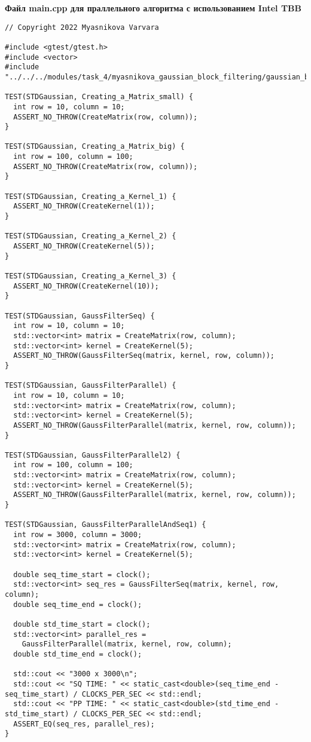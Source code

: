 \documentclass{report}
\begin{document}
\newpage
\textbf{ Файл main.cpp для праллельного алгоритма с использованием Intel TBB }
\begin{lstlisting}
// Copyright 2022 Myasnikova Varvara

#include <gtest/gtest.h>
#include <vector>
#include "../../../modules/task_4/myasnikova_gaussian_block_filtering/gaussian_block_filtering.h"

TEST(STDGaussian, Creating_a_Matrix_small) {
  int row = 10, column = 10;
  ASSERT_NO_THROW(CreateMatrix(row, column));
}

TEST(STDGaussian, Creating_a_Matrix_big) {
  int row = 100, column = 100;
  ASSERT_NO_THROW(CreateMatrix(row, column));
}

TEST(STDGaussian, Creating_a_Kernel_1) {
  ASSERT_NO_THROW(CreateKernel(1));
}

TEST(STDGaussian, Creating_a_Kernel_2) {
  ASSERT_NO_THROW(CreateKernel(5));
}

TEST(STDGaussian, Creating_a_Kernel_3) {
  ASSERT_NO_THROW(CreateKernel(10));
}

TEST(STDGaussian, GaussFilterSeq) {
  int row = 10, column = 10;
  std::vector<int> matrix = CreateMatrix(row, column);
  std::vector<int> kernel = CreateKernel(5);
  ASSERT_NO_THROW(GaussFilterSeq(matrix, kernel, row, column));
}

TEST(STDGaussian, GaussFilterParallel) {
  int row = 10, column = 10;
  std::vector<int> matrix = CreateMatrix(row, column);
  std::vector<int> kernel = CreateKernel(5);
  ASSERT_NO_THROW(GaussFilterParallel(matrix, kernel, row, column));
}

TEST(STDGaussian, GaussFilterParallel2) {
  int row = 100, column = 100;
  std::vector<int> matrix = CreateMatrix(row, column);
  std::vector<int> kernel = CreateKernel(5);
  ASSERT_NO_THROW(GaussFilterParallel(matrix, kernel, row, column));
}

TEST(STDGaussian, GaussFilterParallelAndSeq1) {
  int row = 3000, column = 3000;
  std::vector<int> matrix = CreateMatrix(row, column);
  std::vector<int> kernel = CreateKernel(5);

  double seq_time_start = clock();
  std::vector<int> seq_res = GaussFilterSeq(matrix, kernel, row, column);
  double seq_time_end = clock();

  double std_time_start = clock();
  std::vector<int> parallel_res =
    GaussFilterParallel(matrix, kernel, row, column);
  double std_time_end = clock();

  std::cout << "3000 x 3000\n";
  std::cout << "SQ TIME: " << static_cast<double>(seq_time_end - seq_time_start) / CLOCKS_PER_SEC << std::endl;
  std::cout << "PP TIME: " << static_cast<double>(std_time_end - std_time_start) / CLOCKS_PER_SEC << std::endl;
  ASSERT_EQ(seq_res, parallel_res);
}


\end{lstlisting}
\end{document}
